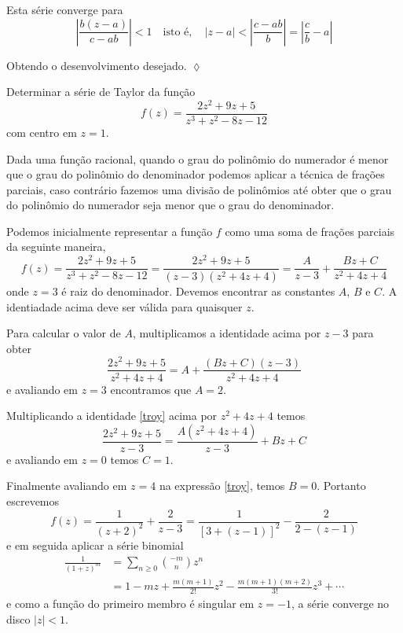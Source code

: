 Esta s\'{e}rie converge para
\begin{equation*}
\left|\frac{b(z - a)}{c-ab}\right| < 1\quad\text{isto \'{e}},\quad |z
- a| < \left|\frac{c - ab}{b}\right|=\left|\frac{c}{b}-a\right|
\end{equation*}

Obtendo o desenvolvimento desejado. \hfill \(\lozenge\)

\begin{exer}
Determinar a s\'{e}rie de Taylor da fun\c{c}\~{a}o
\begin{equation*}
f(z)= \frac{2z^2 +9z +5 }{z^3 + z^2 - 8z - 12}
\end{equation*}
com centro em $z = 1$.
\end{exer}

\solo Dada uma fun\c{c}\~{a}o racional, quando o grau do polin\^{o}mio do numerador \'{e} menor que o grau do
polin\^{o}mio do denominador podemos aplicar a t\'{e}cnica de fra\c{c}\~{o}es parciais, caso contr\'{a}rio fazemos uma divis\~{a}o de
polin\^{o}mios at\'{e} obter que o grau do polin\^{o}mio do numerador seja menor que o grau do denominador.

Podemos inicialmente representar a fun\c{c}\~{a}o $f$ como uma soma de fra\c{c}\~{o}es parciais da seguinte maneira,
\begin{equation}\label{troy}
  f(z)=\frac{2z^2 +9z +5 }{z^3 + z^2 - 8z - 12}=\frac{2z^2 +9z +5 }{(z-3)(z^2 +4z +4)}
  =\frac{A}{z-3}+\frac{Bz+C}{z^2+4z+4}
\end{equation}
onde $z=3$ \'{e} raiz do denominador. Devemos encontrar as constantes $A$, $B$ e $C$. A identiadade acima deve ser
v\'{a}lida para quaisquer $z$.

Para calcular o valor de $A$, multiplicamos a identidade acima por $z-3$ para obter
\begin{equation*}
\frac{2z^2 +9z +5 }{z^2 +4z +4}
  =A+\frac{(Bz+C)(z-3)}{z^2+4z+4}
\end{equation*}
e avaliando em $z=3$ encontramos que $A=2$.

Multiplicando a identidade \eqref{troy} acima por $z^2+4z+4$ temos
\begin{equation*}
\frac{2z^2 +9z +5 }{z-3}
  =\frac{A(z^2+4z+4)}{z-3}+Bz+C
\end{equation*}
e avaliando em $z=0$ temos $C=1$.

Finalmente avaliando em $z=4$ na express\~{a}o \eqref{troy}, temos $B=0$. Portanto escrevemos
\begin{equation*}
f(z) = \frac{1}{(z+2)^2} +\frac{2}{z-3}= \frac{1}{[3 + (z - 1)]^2}
-\frac{2}{2- (z - 1)}
\end{equation*}
e em seguida aplicar a s\'{e}rie binomial
\begin{align}\label{pra143:2}
  \frac{1}{(1+z)^m} &=\sum_{n\geq 0}{-m\choose n}z^n  \nonumber\\[2ex]
   & =1-mz+\frac{m(m+1)}{2!}z^2-\frac{m(m+1)(m+2)}{3!}z^3+\cdots
\end{align}
e como a fun\c{c}\~{a}o do primeiro membro \'{e} singular em $z=-1$, a s\'{e}rie
converge no disco $|z| < 1$.

